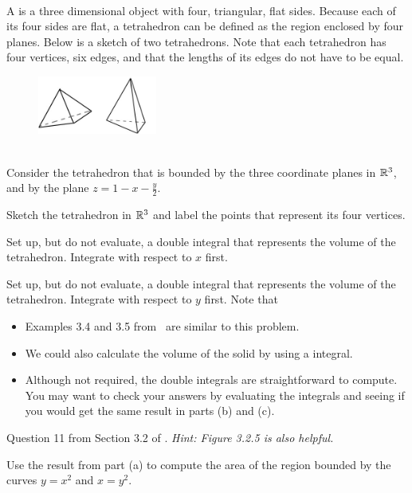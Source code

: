 \documentclass{article}
\begin{document}
\BEN
\item %
 \\
A  is a three dimensional object with four, triangular, flat sides. Because each of its four sides are flat, a tetrahedron can be defined as the region enclosed by four planes. Below is a sketch of two tetrahedrons. Note that each tetrahedron has four vertices, six edges, and that the lengths of its edges do not have to be equal.
\begin{figure}[h]
  \vspace{-1pt}
  \begin{center}
    \includegraphics[width=0.35\textwidth]{ImgTetrahedrons.jpg}
  \end{center}
\end{figure}\\
Consider the tetrahedron that is bounded by the three coordinate planes in $\mathbb{R}^3$, and by the plane $z = 1 - x - \frac{y}{2}$.
\BEN
\item Sketch the tetrahedron in $\mathbb{R}^3$ and label the points that represent its four vertices. 
\item Set up, but do not evaluate, a double integral that represents the volume of the tetrahedron. Integrate with respect to $x$ first. 
\item Set up, but do not evaluate, a double integral that represents the volume of the tetrahedron. Integrate with respect to $y$ first. 
\EEN
Note that
\begin{itemize}
\item Examples 3.4 and 3.5 from \VCT \ are similar to this problem. 
\item We could also calculate the volume of the solid by using a  integral. 
\item Although not required, the double integrals are straightforward to compute. You may want to check your answers by evaluating the integrals and seeing if you would get the same result in parts (b) and (c). 
\end{itemize}
\item  %
\BEN
\item Question 11 from Section 3.2 of \VCT. \textit{Hint: Figure 3.2.5 is also helpful.}
\item Use the result from part (a) to compute the area of the region bounded by the curves $y = x^2$ and $x=y^2$.
\EEN
\end{document}
